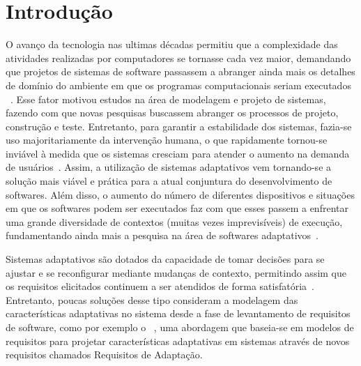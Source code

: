 

\chapter{Introdução}
\label{sec-intro}

O avanço da tecnologia nas ultimas décadas permitiu que a complexidade das atividades realizadas por computadores se tornasse cada vez maior, demandando que projetos de sistemas de software passassem a abranger ainda mais os detalhes de domínio do ambiente em que os programas computacionais seriam executados ~\cite{andersson2009modeling,brun2009engineering}. Esse fator motivou estudos na área de modelagem e projeto de sistemas, fazendo com que novas pesquisas buscassem abranger os processos de projeto, construção e teste. Entretanto, para garantir a estabilidade dos sistemas, fazia-se uso majoritariamente da intervenção humana, o que rapidamente tornou-se inviável à medida que os sistemas cresciam para atender o aumento na demanda de usuários~\cite{andersson2009modeling}. Assim, a utilização de sistemas adaptativos vem tornando-se a solução mais viável e prática para a atual conjuntura do desenvolvimento de softwares. Além disso, o aumento do número de diferentes dispositivos e situações em que os softwares podem ser executados faz com que esses passem a enfrentar uma grande diversidade de contextos (muitas vezes imprevisíveis) de execução, fundamentando ainda mais a pesquisa na área de softwares adaptativos~\cite{kephart2003vision}.

Sistemas adaptativos são dotados da capacidade de tomar decisões para se ajustar e se reconfigurar mediante mudanças de contexto, permitindo assim que os requisitos elicitados continuem a ser atendidos de forma satisfatória~\cite{souza2012requirement}. Entretanto, poucas soluções desse tipo consideram a modelagem das características adaptativas no sistema desde a fase de levantamento de requisitos de software, como por exemplo o \zanshin~\cite{tesevitor}, uma abordagem que baseia-se em modelos de requisitos para projetar características adaptativas em sistemas através de novos requisitos chamados Requisitos de Adaptação. 



